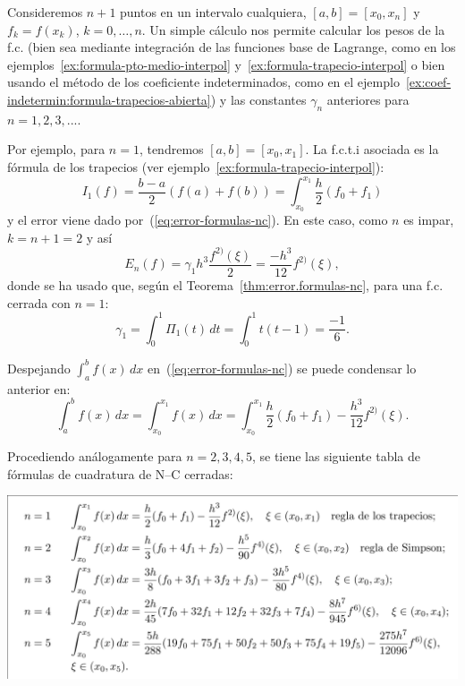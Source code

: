 \begin{example}
  \label{ex:fc-NC-abiertas}
  Consideremos $n+1$ puntos en un intervalo cualquiera,
  $[a,b]=[x_{0},x_{n}]$ y $f_k=f(x_k)$, $k=0,\dots,n$. Un simple
  cálculo nos permite calcular los pesos de la f.c. (bien sea mediante
  integración de las funciones base de Lagrange, como en los
  ejemplos~\ref{ex:formula-pto-medio-interpol}
  y~\ref{ex:formula-trapecio-interpol} o bien usando el método de los
  coeficiente indeterminados, como en el
  ejemplo~\ref{ex:coef-indetermin:formula-trapecios-abierta}) y las
  constantes $\gamma_n$ anteriores para $n=1,2,3,...$.

  Por ejemplo, para $n=1$, tendremos $[a,b]=[x_0,x_1]$. La f.c.t.i
  asociada es la fórmula de los trapecios (ver
  ejemplo~\ref{ex:formula-trapecio-interpol}):
  \begin{equation*}
    I_1(f) = \frac{b-a}{2}(f(a)+f(b))
    = \int_{x_0}^{x_1} \frac{h}{2}(f_0+f_1)
  \end{equation*}
  y el error viene dado por~(\ref{eq:error-formulas-nc}). En este
  caso, como $n$ es impar, $k=n+1=2$ y así
  \begin{equation*}
    E_n(f)=\gamma_1 h^{3}\frac{f^{2)}(\xi)}{2}=\frac{-h^3}{12} f^{2)}(\xi),
  \end{equation*}
  donde se ha usado que, según el Teorema~\ref{thm:error.formulas-nc},
  para una f.c. cerrada con $n=1$:
  \begin{equation*}
    \gamma_1 = \int_0^1 \Pi_1(t)\,dt = \int_0^1 t(t-1) = \frac{-1}{6}.
  \end{equation*}

  Despejando $\int_a^b f(x)\,dx$ en~(\ref{eq:error-formulas-nc}) se
  puede condensar lo anterior en:
  \begin{equation*}
    \int_a^b f(x)\,dx = \int_{x_0}^{x_1} f(x)\,dx =
    \int_{x_0}^{x_1} \frac{h}{2}(f_0+f_1) - \frac{h^3}{12} f^{2)}(\xi).
  \end{equation*}

  Procediendo análogamente para $n=2,3,4,5$, se tiene las
  siguiente tabla de fórmulas de cuadratura de N--C cerradas:
  \begin{center}
    \includegraphics[width=0.95\linewidth]{tema3/formulas-nc-cerradas}
  \end{center}
\end{example}

